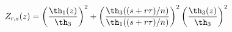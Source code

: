 \begin{equation}
   Z_{r,s}(z)= \left( {\th_1(z)\over\th_3} \right)^2 + \left(
   {\th_3((s+r\tau)/n)\over \th_1((s+r\tau)/n)} \right)^2
   \left( {\th_3(z)\over \th_3} \right)^2 
\end{equation}

